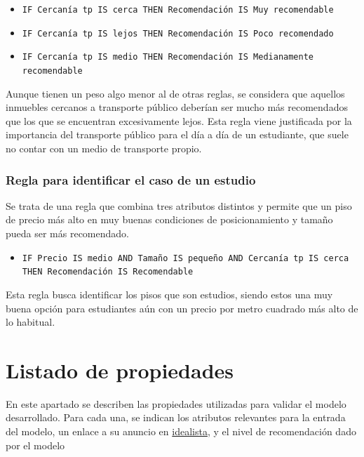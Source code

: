 \documentclass[12pt]{report} %
\begin{document}
    \begin{itemize}
        \item \texttt{IF Cercanía tp IS cerca THEN Recomendación IS Muy recomendable}
        \item \texttt{IF Cercanía tp IS lejos THEN Recomendación IS Poco recomendado}
        \item \texttt{IF Cercanía tp IS medio THEN Recomendación IS Medianamente recomendable}
    \end{itemize}
    
    Aunque tienen un peso algo menor al de otras
    reglas, se considera que aquellos inmuebles cercanos a transporte público deberían ser mucho 
    más recomendados que los que se encuentran excesivamente lejos. Esta regla viene justificada
    por la importancia del transporte público para el día a día de un estudiante, que suele no contar 
    con un medio de transporte propio.

    \subsection{Regla para identificar el caso de un estudio}
    Se trata de una regla que combina tres atributos distintos y permite que un piso de precio más 
    alto en muy buenas condiciones de posicionamiento y tamaño pueda ser más recomendado.

    \begin{itemize}
        \item \texttt{IF Precio IS medio AND Tamaño IS pequeño AND Cercanía tp IS cerca THEN Recomendación IS Recomendable}
    \end{itemize}

    Esta regla busca identificar los pisos que son estudios, siendo estos una muy buena opción 
    para estudiantes aún con un precio por metro cuadrado más alto de lo habitual. 

    \chapter{Listado de propiedades}
    \label{chap:propiedades}
    En este apartado se describen las propiedades utilizadas para validar el
    modelo desarrollado. Para cada una, se indican los atributos relevantes para
    la entrada del modelo, un enlace a su anuncio en
    \href{https://www.idealista.com}{idealista}, y el nivel de recomendación
    dado por el modelo
\end{document}
